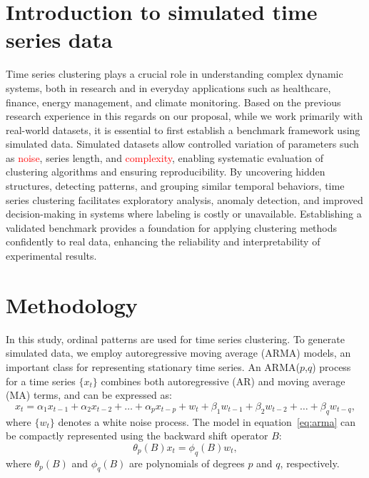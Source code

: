 \documentclass[12pt,a4paper]{article}
\begin{document}
\section{Introduction to simulated time series data}
Time series clustering plays a crucial role in understanding complex dynamic systems, both in research and in everyday applications such as healthcare, finance, energy management, and climate monitoring. Based on the previous research experience in this regards on our proposal, while we work primarily with real-world datasets, it is essential to first establish a benchmark framework using simulated data. Simulated datasets allow controlled variation of parameters such as \textcolor{red}{noise}, series length, and \textcolor{red}{complexity}, enabling systematic evaluation of clustering algorithms and ensuring reproducibility. By uncovering hidden structures, detecting patterns, and grouping similar temporal behaviors, time series clustering facilitates exploratory analysis, anomaly detection, and improved decision-making in systems where labeling is costly or unavailable. Establishing a validated benchmark provides a foundation for applying clustering methods confidently to real data, enhancing the reliability and interpretability of experimental results.
	
\section{Methodology}

In this study, ordinal patterns are used for time series clustering. To generate simulated data, we employ autoregressive moving average (ARMA) models, an important class for representing stationary time series. An ARMA($p$,$q$) process for a time series $\{x_t\}$ combines both autoregressive (AR) and moving average (MA) terms, and can be expressed as:
\begin{equation}
	x_t = \alpha_1 x_{t-1} + \alpha_2 x_{t-2} + \dots + \alpha_p x_{t-p} + w_t + \beta_1 w_{t-1} + \beta_2 w_{t-2} + \dots + \beta_q w_{t-q},
	\label{eq:arma}
\end{equation}
where $\{w_t\}$ denotes a white noise process. The model in equation~\eqref{eq:arma} can be compactly represented using the backward shift operator $B$:
\begin{equation}
	\theta_p(B) x_t = \phi_q(B) w_t,
	\label{eq:arma_polynomial}
\end{equation}
where $\theta_p(B)$ and $\phi_q(B)$ are polynomials of degrees $p$ and $q$, respectively.
\end{document}
